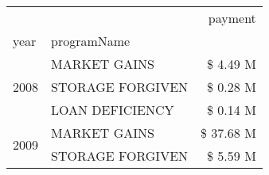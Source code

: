 \begin{tabular}{llr}
\toprule
 &  & payment \\
year & programName &  \\
\midrule
\multirow[t]{3}{*}{2008} & MARKET GAINS & \$ 4.49 M \\
 & STORAGE FORGIVEN & \$ 0.28 M \\
 & LOAN DEFICIENCY & \$ 0.14 M \\
\cline{1-3}
\multirow[t]{2}{*}{2009} & MARKET GAINS & \$ 37.68 M \\
 & STORAGE FORGIVEN & \$ 5.59 M \\
\cline{1-3}
\bottomrule
\end{tabular}
